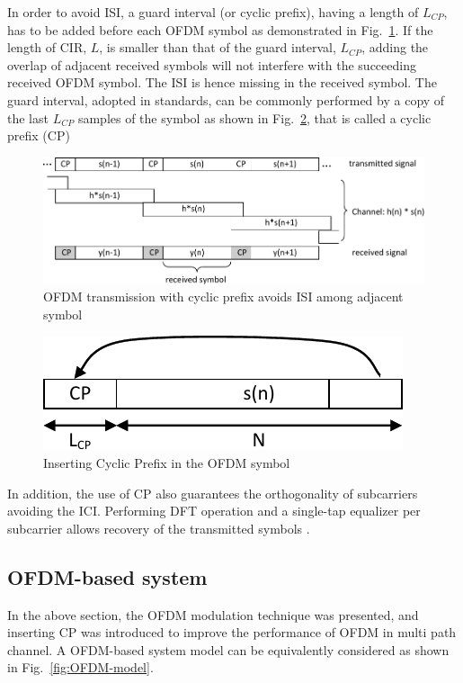 In order to avoid ISI, a guard interval (or cyclic prefix), having a length of $L_{CP}$, has to be added before each OFDM symbol as demonstrated in Fig.~\ref{fig:CIR-CP}.
If the length of CIR, $L$, is smaller than that of the guard interval, $L_{CP}$, adding the overlap of adjacent received symbols will not interfere with the succeeding received OFDM symbol.
The ISI is hence missing in the received symbol.
The guard interval, adopted in standards, can be commonly performed by a copy of the last $L_{CP}$ samples of the symbol as shown in Fig.~\ref{fig:CP}, that is called a cyclic prefix (CP)

\begin{figure}
	\centerline{\includegraphics [width=0.8\columnwidth] {Figures/CIR_CP.pdf} }
	\caption{OFDM transmission with cyclic prefix avoids ISI among adjacent symbol}
	\label{fig:CIR-CP}
\end{figure}

\begin{figure}
	\centerline{\includegraphics [width=0.8\columnwidth] {Figures/CP.pdf} }
	\caption{Inserting Cyclic Prefix in the OFDM symbol}
	\label{fig:CP}
\end{figure}

In addition, the use of CP also guarantees the orthogonality of subcarriers avoiding the ICI. Performing DFT operation and a single-tap equalizer per subcarrier allows recovery of the transmitted symbols \cite{farhang2008signal}.

\subsection{OFDM-based system}
In the above section, the OFDM modulation technique was presented, and inserting CP was introduced to improve the performance of OFDM in multi path channel.
A OFDM-based system model can be equivalently considered as shown in Fig.~\ref{fig:OFDM-model}.

